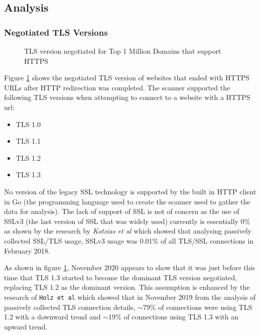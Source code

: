 \documentclass{mscreport}
\begin{document}
\subsection{Analysis}

\subsubsection{Negotiated TLS Versions}

\begin{figure}[H]
	\begin{center}
		\caption{TLS version negotiated for Top 1 Million Domains that support HTTPS}
		\label{fig:tls_negotiated}
	\end{center}
\end{figure}

\noindent
Figure \ref{fig:tls_negotiated} shows the negotiated TLS version of websites that ended with HTTPS URLs after HTTP redirection was completed. The scanner supported the following TLS versions when attempting to connect to a website with a HTTPS url:

\newpage
\clearpage

\begin{itemize}
  \setlength\itemsep{0.1em}
  \item TLS 1.0
  \item TLS 1.1
  \item TLS 1.2
  \item TLS 1.3
\end{itemize}

\noindent
No version of the legacy SSL technology is supported by the built in HTTP client in Go (the programming language used to create the scanner used to gather the data for analysis). The lack of support of SSL is not of concern as the use of SSLv3 (the last version of SSL that was widely used) currently is essentially 0\% as shown by the research by \textit{Kotzias et al} \cite{Kotzias2018-wd} which showed that analysing passively collected SSL/TLS usage, SSLv3 usage was 0.01\% of all TLS/SSL connections in February 2018.

\vspace{0.3cm} \noindent
As shown in figure \ref{fig:tls_negotiated}, November 2020 appears to show that it was just before this time that TLS 1.3 started to become the dominant TLS version negotiated, replacing TLS 1.2 as the dominant version. This assumption is enhanced by the research of \texttt{Holz et al} \cite{Holz2020-ha} which showed that in November 2019 from the analysis of passively collected TLS connection details, $\sim$79\% of connections were using TLS 1.2 with a downward trend and $\sim$19\% of connections using TLS 1.3 with an upward trend.
\end{document}
